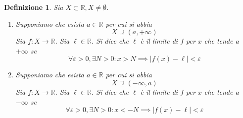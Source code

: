 \documentclass[11pt]{book}
\newtheorem{definition}{Definizione}[chapter]
\begin{document}
\begin{definition}
    Sia $X\subset\mathbb{R},X\neq\emptyset$.
    \begin{enumerate}
        \item Supponiamo che esista $a\in\mathbb{R}$ per cui si abbia
        \begin{equation*}
            X\supseteq(a,+\infty)
        \end{equation*}
        Sia $f:X\rightarrow\mathbb{R}$. Sia $\ell\in\mathbb{R}$. Si dice che $\ell$ è il limite di $f$ per $x$ che tende
        a $+\infty$ se 
        \begin{equation*}
            \forall\varepsilon>0,\exists N>0:x>N\implies|f(x)-\ell|<\varepsilon
        \end{equation*}
        \item Supponiamo che esista $a\in\mathbb{R}$ per cui si abbia
        \begin{equation*}
            X\supseteq(-\infty,a)
        \end{equation*}
        Sia $f:X\rightarrow\mathbb{R}$. Sia $\ell\in\mathbb{R}$. Si dice che $\ell$ è il limite di $f$ per $x$ che tende
        a $-\infty$ se 
        \begin{equation*}
            \forall\varepsilon>0,\exists N>0:x<-N\implies|f(x)-\ell|<\varepsilon
        \end{equation*}
    \end{enumerate}
\end{definition}
\end{document}
